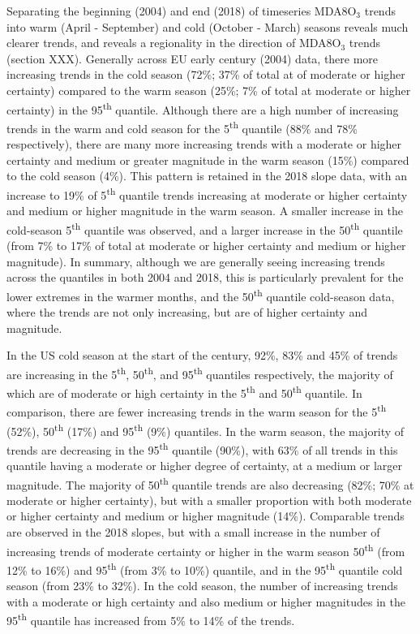 \documentclass[journal abbreviation, manuscript]{copernicus}
\begin{document}
Separating the beginning (2004) and end (2018) of timeseries MDA8O$_3$ trends into warm (April - September) and cold (October - March) seasons reveals much clearer trends, and reveals a regionality in the direction of MDA8O$_3$ trends (section XXX). Generally across EU early century (2004) data, there more increasing trends in the cold season (72\%; 37\% of total at of moderate or higher certainty) compared to the warm season (25\%; 7\% of total at moderate or higher certainty) in the 95\textsuperscript{th} quantile. Although there are a high number of increasing trends in the warm and cold season for the 5\textsuperscript{th} quantile (88\% and 78\% respectively), there are many more increasing trends with a moderate or higher certainty and medium or greater magnitude in the warm season (15\%) compared to the cold season (4\%). This pattern is retained in the 2018 slope data, with an increase to 19\% of 5\textsuperscript{th} quantile trends increasing at moderate or higher certainty and medium or higher magnitude in the warm season. A smaller increase in the cold-season 5\textsuperscript{th} quantile was observed, and a larger increase in the 50\textsuperscript{th} quantile (from 7\% to 17\% of total at moderate or higher certainty and medium or higher magnitude). In summary, although we are generally seeing increasing trends across the quantiles in both 2004 and 2018, this is particularly prevalent for the lower extremes in the warmer months, and the 50\textsuperscript{th} quantile cold-season data, where the trends are not only increasing, but are of higher certainty and magnitude.

In the US cold season at the start of the century, 92\%, 83\% and 45\% of trends are increasing in the 5\textsuperscript{th}, 50\textsuperscript{th}, and 95\textsuperscript{th} quantiles respectively, the majority of which are of moderate or high certainty in the 5\textsuperscript{th} and 50\textsuperscript{th} quantile. In comparison, there are fewer increasing trends in the warm season for the 5\textsuperscript{th} (52\%), 50\textsuperscript{th} (17\%) and 95\textsuperscript{th} (9\%) quantiles. In the warm season, the majority of trends are decreasing in the 95\textsuperscript{th} quantile (90\%), with 63\% of all trends in this quantile having a moderate or higher degree of certainty, at a medium or larger magnitude. The majority of 50\textsuperscript{th} quantile trends are also decreasing (82\%; 70\% at moderate or higher certainty), but with a smaller proportion with both moderate or higher certainty and medium or higher magnitude (14\%). Comparable trends are observed in the 2018 slopes, but with a small increase in the number of increasing trends of moderate certainty or higher in the warm season 50\textsuperscript{th} (from 12\% to 16\%) and 95\textsuperscript{th} (from 3\% to 10\%) quantile, and in the 95\textsuperscript{th} quantile cold season (from 23\% to 32\%). In the cold season, the number of increasing trends with a moderate or high certainty and also medium or higher magnitudes in the 95\textsuperscript{th} quantile has increased from 5\% to 14\% of the trends.
\end{document}
